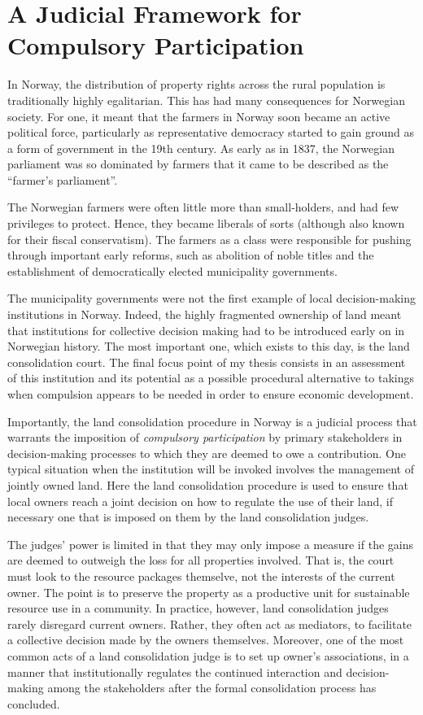 \section{A Judicial Framework for Compulsory Participation}

In Norway, the distribution of property rights across the rural population is traditionally highly egalitarian. This has had many consequences for Norwegian society. For one, it meant that the farmers in Norway soon became an active political force, particularly as representative democracy started to gain ground as a form of government in the 19th century. As early as in 1837, the Norwegian parliament was so dominated by farmers that it came to be described as the ``farmer's parliament''.

The Norwegian farmers were often little more than small-holders, and had few privileges to protect. Hence, they became liberals of sorts (although also known for their fiscal conservatism). The farmers as a class were responsible for pushing through important early reforms, such as abolition of noble titles and the establishment of democratically elected municipality governments.

The municipality governments were not the first example of local decision-making institutions in Norway. Indeed, the highly fragmented ownership of land meant that institutions for collective decision making had to be introduced early on in Norwegian history. The most important one, which exists to this day, is the land consolidation court. The final focus point of my thesis consists in an assessment of this institution and its potential as a possible procedural alternative to takings when compulsion appears to be needed in order to ensure economic development.

Importantly, the land consolidation procedure in Norway is a judicial process that warrants the imposition of {\it compulsory participation} by primary stakeholders in decision-making processes to which they are deemed to owe a contribution. One typical situation when the institution will be invoked involves the management of jointly owned land. Here the land consolidation procedure is used to ensure that local owners reach a joint decision on how to regulate the use of their land, if necessary one that is imposed on them by the land consolidation judges.

The judges' power is limited in that they may only impose a measure if the gains are deemed to outweigh the loss for all properties involved. That is, the court must look to the resource packages themselve, not the interests of the current owner. The point is to preserve the property as a productive unit for sustainable resource use in a community. In practice, however, land consolidation judges rarely disregard current owners. Rather, they often act as mediators, to facilitate a collective decision made by the owners themselves. Moreover, one of the most common acts of a land consolidation judge is to set up owner's associations, in a manner that institutionally regulates the continued interaction and decision-making among the stakeholders after the formal consolidation process has concluded.

